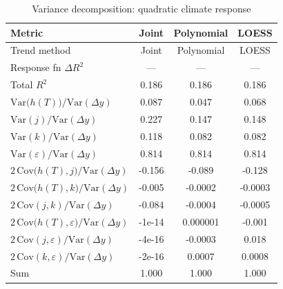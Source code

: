 \begin{table}[htbp]
\centering
\caption{Variance decomposition: quadratic climate response}
\label{tab:variance_decomp_quadratic}

\small
\begin{tabular}{@{}lccc@{}}
\toprule
Metric & Joint & Polynomial & LOESS \\
\midrule
Trend method & Joint & Polynomial & LOESS \\
\midrule
Response fn $\Delta R^2$ & — & — & — \\
Total $R^2$ & 0.186 & 0.186 & 0.186 \\
\midrule
$\mathrm{Var}\!\big(h(T)\big)/\mathrm{Var}(\Delta y)$ & 0.087 & 0.047 & 0.068 \\
$\mathrm{Var}(j)/\mathrm{Var}(\Delta y)$ & 0.227 & 0.147 & 0.148 \\
$\mathrm{Var}(k)/\mathrm{Var}(\Delta y)$ & 0.118 & 0.082 & 0.082 \\
$\mathrm{Var}(\varepsilon)/\mathrm{Var}(\Delta y)$ & 0.814 & 0.814 & 0.814 \\
\midrule
$2\,\mathrm{Cov}\!\big(h(T),j\big)/\mathrm{Var}(\Delta y)$ & -0.156 & -0.089 & -0.128 \\
$2\,\mathrm{Cov}\!\big(h(T),k\big)/\mathrm{Var}(\Delta y)$ & -0.005 & -0.0002 & -0.0003 \\
$2\,\mathrm{Cov}(j,k)/\mathrm{Var}(\Delta y)$ & -0.084 & -0.0004 & -0.0005 \\
$2\,\mathrm{Cov}\!\big(h(T),\varepsilon\big)/\mathrm{Var}(\Delta y)$ & -1e-14 & 0.000001 & -0.001 \\
$2\,\mathrm{Cov}(j,\varepsilon)/\mathrm{Var}(\Delta y)$ & -4e-16 & -0.0003 & 0.018 \\
$2\,\mathrm{Cov}(k,\varepsilon)/\mathrm{Var}(\Delta y)$ & -2e-16 & 0.0007 & 0.0008 \\
\midrule
Sum & 1.000 & 1.000 & 1.000 \\
\bottomrule
\end{tabular}
\end{table}